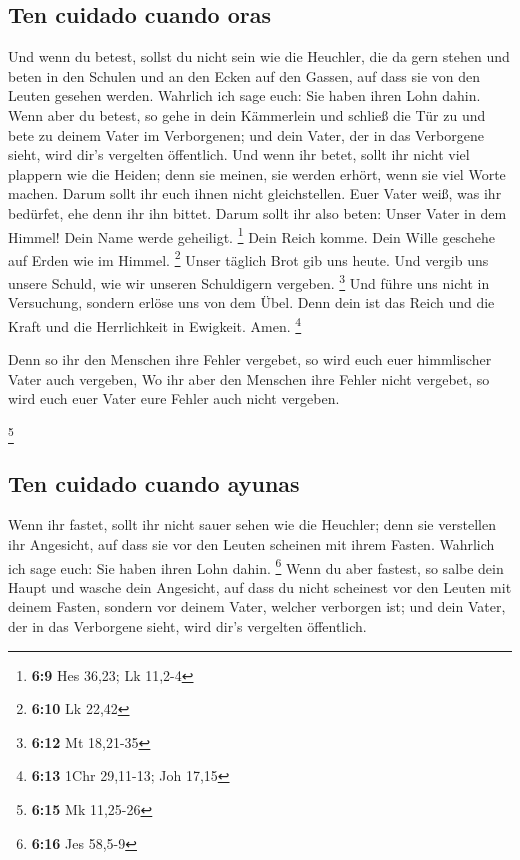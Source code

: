 \hypertarget{ten-cuidado-cuando-oras}{%
\subsection{Ten cuidado cuando oras}\label{ten-cuidado-cuando-oras}}

 Und wenn du betest, sollst du nicht sein wie die
Heuchler, die da gern stehen und beten in den Schulen und an den Ecken
auf den Gassen, auf dass sie von den Leuten gesehen werden. Wahrlich ich
sage euch: Sie haben ihren Lohn dahin.  Wenn aber du
betest, so gehe in dein Kämmerlein und schließ die Tür zu und bete zu
deinem Vater im Verborgenen; und dein Vater, der in das Verborgene
sieht, wird dir's vergelten öffentlich.  Und wenn ihr
betet, sollt ihr nicht viel plappern wie die Heiden; denn sie meinen,
sie werden erhört, wenn sie viel Worte machen.  Darum
sollt ihr euch ihnen nicht gleichstellen. Euer Vater weiß, was ihr
bedürfet, ehe denn ihr ihn bittet.  Darum sollt ihr also
beten: Unser Vater in dem Himmel! Dein Name werde geheiligt. \footnote{\textbf{6:9}
  Hes 36,23; Lk 11,2-4}  Dein Reich komme. Dein Wille
geschehe auf Erden wie im Himmel. \footnote{\textbf{6:10} Lk 22,42}
 Unser täglich Brot gib uns heute.  Und
vergib uns unsere Schuld, wie wir unseren Schuldigern vergeben.
\footnote{\textbf{6:12} Mt 18,21-35}  Und führe uns nicht
in Versuchung, sondern erlöse uns von dem Übel. Denn dein ist das Reich
und die Kraft und die Herrlichkeit in Ewigkeit. Amen. \footnote{\textbf{6:13}
  1Chr 29,11-13; Joh 17,15}

 Denn so ihr den Menschen ihre Fehler vergebet, so wird
euch euer himmlischer Vater auch vergeben,  Wo ihr aber
den Menschen ihre Fehler nicht vergebet, so wird euch euer Vater eure
Fehler auch nicht vergeben.

\footnote{\textbf{6:15} Mk 11,25-26}

\hypertarget{ten-cuidado-cuando-ayunas}{%
\subsection{Ten cuidado cuando ayunas}\label{ten-cuidado-cuando-ayunas}}

 Wenn ihr fastet, sollt ihr nicht sauer sehen wie die
Heuchler; denn sie verstellen ihr Angesicht, auf dass sie vor den Leuten
scheinen mit ihrem Fasten. Wahrlich ich sage euch: Sie haben ihren Lohn
dahin. \footnote{\textbf{6:16} Jes 58,5-9}  Wenn du aber
fastest, so salbe dein Haupt und wasche dein Angesicht, 
auf dass du nicht scheinest vor den Leuten mit deinem Fasten, sondern
vor deinem Vater, welcher verborgen ist; und dein Vater, der in das
Verborgene sieht, wird dir's vergelten öffentlich.

